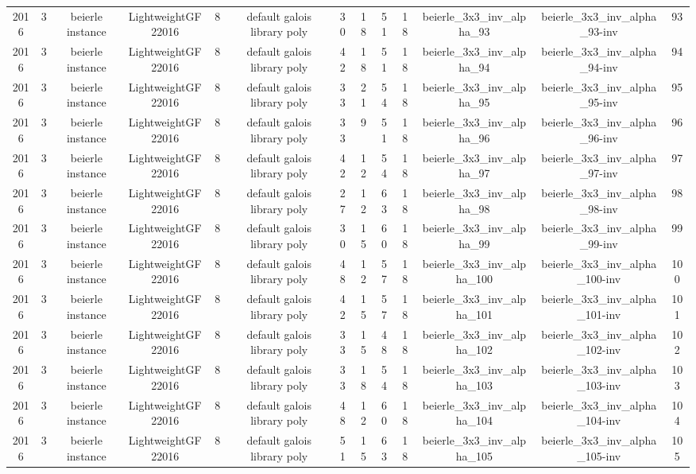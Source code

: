 \begin{tabular}{c c c c c c c c c c c c c}
2016 & 3 & beierle instance & LightweightGF22016 & 8 & default galois library poly & 30 & 18 & 51 & 18 & beierle_3x3_inv_alpha_93 & beierle_3x3_inv_alpha_93-inv & 93 \\
2016 & 3 & beierle instance & LightweightGF22016 & 8 & default galois library poly & 42 & 18 & 51 & 18 & beierle_3x3_inv_alpha_94 & beierle_3x3_inv_alpha_94-inv & 94 \\
2016 & 3 & beierle instance & LightweightGF22016 & 8 & default galois library poly & 33 & 21 & 54 & 18 & beierle_3x3_inv_alpha_95 & beierle_3x3_inv_alpha_95-inv & 95 \\
2016 & 3 & beierle instance & LightweightGF22016 & 8 & default galois library poly & 33 & 9 & 51 & 18 & beierle_3x3_inv_alpha_96 & beierle_3x3_inv_alpha_96-inv & 96 \\
2016 & 3 & beierle instance & LightweightGF22016 & 8 & default galois library poly & 42 & 12 & 54 & 18 & beierle_3x3_inv_alpha_97 & beierle_3x3_inv_alpha_97-inv & 97 \\
2016 & 3 & beierle instance & LightweightGF22016 & 8 & default galois library poly & 27 & 12 & 63 & 18 & beierle_3x3_inv_alpha_98 & beierle_3x3_inv_alpha_98-inv & 98 \\
2016 & 3 & beierle instance & LightweightGF22016 & 8 & default galois library poly & 30 & 15 & 60 & 18 & beierle_3x3_inv_alpha_99 & beierle_3x3_inv_alpha_99-inv & 99 \\
2016 & 3 & beierle instance & LightweightGF22016 & 8 & default galois library poly & 48 & 12 & 57 & 18 & beierle_3x3_inv_alpha_100 & beierle_3x3_inv_alpha_100-inv & 100 \\
2016 & 3 & beierle instance & LightweightGF22016 & 8 & default galois library poly & 42 & 15 & 57 & 18 & beierle_3x3_inv_alpha_101 & beierle_3x3_inv_alpha_101-inv & 101 \\
2016 & 3 & beierle instance & LightweightGF22016 & 8 & default galois library poly & 33 & 15 & 48 & 18 & beierle_3x3_inv_alpha_102 & beierle_3x3_inv_alpha_102-inv & 102 \\
2016 & 3 & beierle instance & LightweightGF22016 & 8 & default galois library poly & 33 & 18 & 54 & 18 & beierle_3x3_inv_alpha_103 & beierle_3x3_inv_alpha_103-inv & 103 \\
2016 & 3 & beierle instance & LightweightGF22016 & 8 & default galois library poly & 48 & 12 & 60 & 18 & beierle_3x3_inv_alpha_104 & beierle_3x3_inv_alpha_104-inv & 104 \\
2016 & 3 & beierle instance & LightweightGF22016 & 8 & default galois library poly & 51 & 15 & 63 & 18 & beierle_3x3_inv_alpha_105 & beierle_3x3_inv_alpha_105-inv & 105 \\

\end{tabular}

